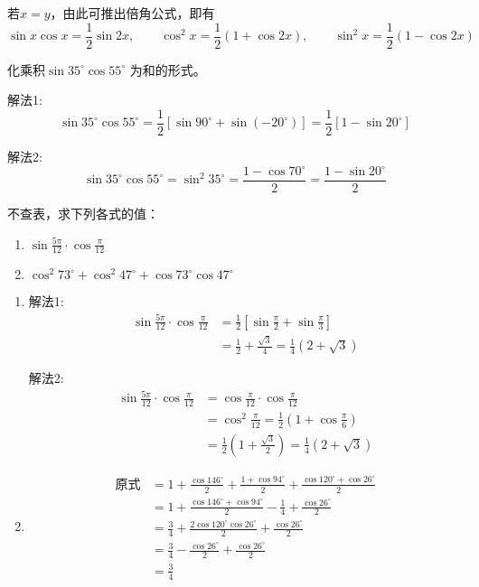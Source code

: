 若$x=y$，由此可推出倍角公式，即有
\[\sin x\cos x=\frac{1}{2}\sin 2x,\qquad \cos^2 x=\frac{1}{2}(1+\cos 2x),\qquad \sin^2x=\frac{1}{2}(1-\cos2x)\]

\begin{example}
    化乘积$\sin35^{\circ} \cos55^{\circ}$ 为和的形式。
\end{example}

\begin{solution}
解法1: 
\[\sin35^{\circ} \cos55^{\circ} =\frac{1}{2}[\sin90^{\circ} +\sin (-20^{\circ} ) ]
=\frac{1}{2} [1-\sin20^{\circ} ]\]

解法2:
\[\sin35^{\circ} \cos55^{\circ}=\sin^2 35^{\circ} =\frac{1-\cos 70^{\circ}}{2}=\frac{1-\sin 20^{\circ}}{2}\]
\end{solution}


\begin{example}
    不查表，求下列各式的值：
\begin{enumerate}
    \item $\sin\frac{5\pi}{12}\cdot\cos\frac{\pi}{12}$
    \item $\cos^2 73^{\circ} +\cos^2 47^{\circ} +\cos73^{\circ} \cos47^{\circ}$
\end{enumerate}
\end{example}

\begin{solution}
\begin{enumerate}
    \item 解法1: 
\[\begin{split}
    \sin\frac{5\pi}{12}\cdot\cos\frac{\pi}{12}&=\frac{1}{2}\left[\sin\frac{\pi}{2}+\sin\frac{\pi}{3}\right]\\
    &=\frac{1}{2}+\frac{\sqrt{3}}{4}=\frac{1}{4}(2+\sqrt{3})
\end{split}\]    

解法2: 
\[\begin{split}
    \sin\frac{5\pi}{12}\cdot\cos\frac{\pi}{12}&=\cos\frac{\pi}{12}\cdot \cos\frac{\pi}{12}\\
    &=\cos^2\frac{\pi}{12}=\frac{1}{2}\left(1+\cos\frac{\pi}{6}\right)\\
    &=\frac{1}{2}\left(1+\frac{\sqrt{3}}{2}\right)=\frac{1}{4}\left(2+\sqrt{3}\right)
\end{split}\]    

\item \[\begin{split}
    \text{原式}&=1+\frac{\cos146^{\circ}}{2}+\frac{1+\cos94^{\circ}}{2}+\frac{\cos120^{\circ}+\cos26^{\circ}}{2}\\
    &=1+\frac{\cos146^{\circ}+\cos94^{\circ}}{2}-\frac{1}{4}+\frac{\cos26^{\circ}}{2}\\
    &=\frac{3}{4}+\frac{2\cos120^{\circ}\cos26^{\circ}}{2}+\frac{\cos26^{\circ}}{2}\\
    &=\frac{3}{4}-\frac{\cos26^{\circ}}{2}+\frac{\cos26^{\circ}}{2}\\
    &=\frac{3}{4}
\end{split}\]
\end{enumerate}
\end{solution}


